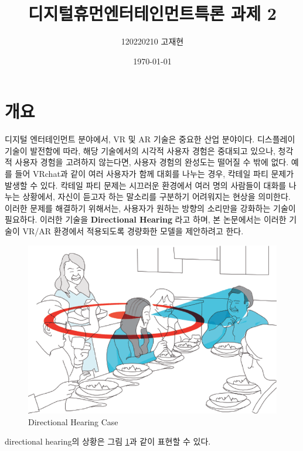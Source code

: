 \documentclass[
	9pt,
	a4paper,
	figtabcapt,
]{oblivoir}
\title{\vspace{-4cm}디지털휴먼엔터테인먼트특론 과제 2}
\author{120220210 고재현}
\date{\today}
\begin{document}
\maketitle





\setcounter{table}{0}		                    %
\setcounter{figure}{0}		                    %



\section{개요} \label{sec:overview}
디지털 엔터테인먼트 분야에서, VR 및 AR 기술은 중요한 산업 분야이다.
디스플레이 기술이 발전함에 따라, 해당 기술에서의 시각적 사용자 경험은 중대되고 있으나,
청각적 사용자 경험을 고려하지 않는다면, 사용자 경험의 완성도는 떨어질 수 밖에 없다.
예를 들어 VRchat과 같이 여러 사용자가 함께 대회를 나누는 경우, 칵테일 파티 문제가 발생할 수 있다.
칵테일 파티 문제는 시끄러운 환경에서 여러 명의 사람들이 대화를 나누는 상황에서, 자신이 듣고자 하는 말소리를 구분하기 어려워지는 현상을 의미한다.
이러한 문제를 해결하기 위해서는, 사용자가 원하는 방향의 소리만을 강화하는 기술이 필요하다.
이러한 기술을 \textbf{Directional Hearing} 라고 하며, 본 논문에서는 이러한 기술이 VR/AR 환경에서 적용되도록 경량화한 모델을 제안하려고 한다.
\begin{figure}[htbp]
	\centering
	\label{fig:directhear}
	\includegraphics[width=0.5\linewidth]{figures/directhear.png}
	\caption{Directional Hearing Case}
\end{figure}
directional hearing의 상황은 그림 \ref{fig:directhear}과 같이 표현할 수 있다.
\end{document}
